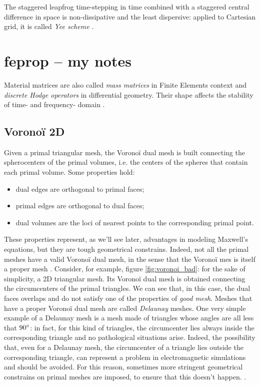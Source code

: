 The staggered leapfrog time-stepping in time combined with a staggered
central difference in space is non-dissipative and the least
dispersive: applied to Cartesian grid, it is called \emph{Yee scheme}
\cite{yee_boh}.

\section{feprop -- my notes}


Material matrices are also called \emph{mass matrices} in Finite
Elements context and \emph{discrete Hodge operators} in differential
geometry. Their shape affects the stability of time- and frequency-
domain \cite{schuhmann_whitney} \cite{schuhmann_stability}.

\subsection{Vorono\"i 2D} \label{sec:voronoi}

Given a primal triangular mesh, the Vorono\"i dual mesh is built
connecting the spherocenters of the primal volumes, i.e. the centers
of the spheres that contain each primal volume. Some properties hold:
\begin{itemize}
\item
  dual edges are orthogonal to primal faces;
\item
  primal edges are orthogonal to dual faces;
\item
  dual volumes are the loci of nearest points to the corresponding
  primal point.
\end{itemize}

These properties represent, as we'll see later, advantages in modeling
Maxwell's equations, but they are tough geometrical
constrains. Indeed, not all the primal meshes have a valid Vorono\"i
dual mesh, in the sense that the Vorono\"i mes is itself a proper mesh
. Consider, for example, figure
\ref{fig:voronoi_bad}: for the sake of simplicity, a 2D triangular
mesh. Its Vorono\"i dual mesh is obtained connecting the circumcenters
of the primal triangles. We can see that, in this case, the dual faces
overlaps and do not satisfy one of the properties of \emph{good
mesh}. Meshes that have a proper Vorono\"i dual mesh are called
\emph{Delaunay} meshes. One very simple example of a Delaunay mesh is
a mesh made of triangles whose angles are all less that $90^\circ$:
in fact, for this kind of triangles, the circumcenter lies always
inside the corresponding triangle and no pathological situations
arise. Indeed, the possibility that, even for a Delaunay mesh, the
circumcenter of a triangle lies outside the corresponding triangle,
can represent a problem in electromagnetic simulations and should be
avoided. For this reason, sometimes more stringent geometrical
constrains on primal meshes are imposed, to ensure that this doesn't
happen. .

